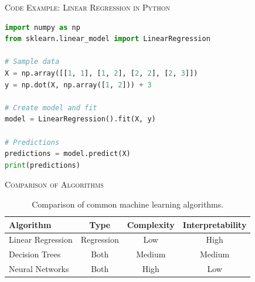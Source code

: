 \documentclass[compress]{beamer}
\begin{document}
\begin{frame}[fragile]{\textsc{Code Example: Linear Regression in Python}}
  \begin{lstlisting}[language=Python]
import numpy as np
from sklearn.linear_model import LinearRegression

# Sample data
X = np.array([[1, 1], [1, 2], [2, 2], [2, 3]])
y = np.dot(X, np.array([1, 2])) + 3

# Create model and fit
model = LinearRegression().fit(X, y)

# Predictions
predictions = model.predict(X)
print(predictions)
  \end{lstlisting}
\end{frame}


\begin{frame}{\textsc{Comparison of Algorithms}}
  \begin{table}[h!]
    \centering
    \begin{tabular}{lccc}
      \toprule
      \textbf{Algorithm} & \textbf{Type} & \textbf{Complexity} & \textbf{Interpretability} \\
      \midrule
      Linear Regression & Regression & Low & High \\
      Decision Trees & Both & Medium & Medium \\
      Neural Networks & Both & High & Low \\
      \bottomrule
    \end{tabular}
    \caption{Comparison of common machine learning algorithms.}
  \end{table}
\end{frame}

\end{document}
